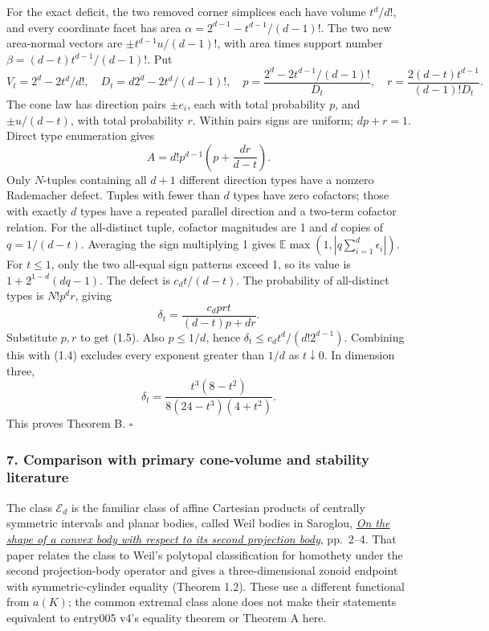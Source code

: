 \documentclass[
  11pt,
]{article}
\begin{document}
For the exact deficit, the two removed corner simplices each have volume
\(t^d/d!\), and every coordinate facet has area
\(\alpha=2^{d-1}-t^{d-1}/(d-1)!\). The two new area-normal vectors are
\(\pm t^{d-1}u/(d-1)!\), with area times support number
\(\beta=(d-t)t^{d-1}/(d-1)!\). Put \[
 V_t=2^d-2t^d/d!,\quad D_t=d2^d-2t^d/(d-1)!,\quad
 p=\frac{2^d-2t^{d-1}/(d-1)!}{D_t},\quad
 r=\frac{2(d-t)t^{d-1}}{(d-1)!D_t}.
\] The cone law has direction pairs \(\pm e_i\), each with total
probability \(p\), and \(\pm u/(d-t)\), with total probability \(r\).
Within pairs signs are uniform; \(dp+r=1\). Direct type enumeration
gives \[
 A=d!p^{d-1}\left(p+\frac{dr}{d-t}\right).
\] Only \(N\)-tuples containing all \(d+1\) different direction types
have a nonzero Rademacher defect. Tuples with fewer than \(d\) types
have zero cofactors; those with exactly \(d\) types have a repeated
parallel direction and a two-term cofactor relation. For the
all-distinct tuple, cofactor magnitudes are 1 and \(d\) copies of
\(q=1/(d-t)\). Averaging the sign multiplying 1 gives
\(\mathbb E\max(1,|q\sum_{i=1}^d\epsilon_i|)\). For \(t\le1\), only the
two all-equal sign patterns exceed 1, so its value is
\(1+2^{1-d}(dq-1)\). The defect is \(c_dt/(d-t)\). The probability of
all-distinct types is \(N!p^dr\), giving \[
 \delta_t=\frac{c_dprt}{(d-t)p+dr}.
\] Substitute \(p,r\) to get (1.5). Also \(p\le1/d\), hence
\(\delta_t\le c_dt^d/(d!2^{d-1})\). Combining this with (1.4) excludes
every exponent greater than \(1/d\) as \(t\downarrow0\). In dimension
three, \[
 \delta_t=\frac{t^3(8-t^2)}{8(24-t^3)(4+t^2)}.
\] This proves Theorem B. \(\square\)

\subsubsection{7. Comparison with primary cone-volume and stability
literature}\label{comparison-with-primary-cone-volume-and-stability-literature}

The class \(\mathcal E_d\) is the familiar class of affine Cartesian
products of centrally symmetric intervals and planar bodies, called Weil
bodies in Saroglou, \href{https://arxiv.org/pdf/1409.4347v2}{\emph{On
the shape of a convex body with respect to its second projection body}},
pp.~2--4. That paper relates the class to Weil's polytopal
classification for homothety under the second projection-body operator
and gives a three-dimensional zonoid endpoint with symmetric-cylinder
equality (Theorem 1.2). These use a different functional from \(a(K)\);
the common extremal class alone does not make their statements
equivalent to entry005 v4's equality theorem or Theorem A here.
\end{document}

